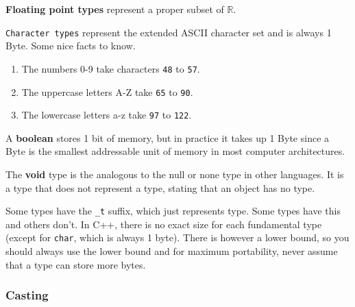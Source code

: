 \documentclass{article}
\newcounter{definition}[section]
\newcounter{example}[section]
\begin{document}
    \begin{definition}
      \label{def:floating-point-types}
      \textbf{Floating point types} represent a proper subset of $\mathbb{R}$. 
    \end{definition}

    \begin{definition}[Char]
      \label{def:char}
      \texttt{Character types} represent the extended ASCII character set and is always 1 Byte. Some nice facts to know. 
      \begin{enumerate}
        \item The numbers 0-9 take characters \texttt{48} to \texttt{57}.
        \item The uppercase letters A-Z take \texttt{65} to \texttt{90}. 
        \item The lowercase letters a-z take \texttt{97} to \texttt{122}. 
      \end{enumerate}
    \end{definition}

    \begin{definition}[Boolean]
      \label{def:boolean}
      A \textbf{boolean} stores 1 bit of memory, but in practice it takes up 1 Byte since a Byte is the smallest addressable unit of memory in most computer architectures. 
    \end{definition}

    \begin{definition}[Void]
      \label{def:void}
      The \textbf{void} type is the analogous to the null or none type in other languages. It is a type that does not represent a type, stating that an object has no type. 
    \end{definition} 

    \begin{example}
      \label{ex:types-with-t-suffix}
      Some types have the \texttt{\_t} suffix, which just represents type. Some types have this and others don't. In C++, there is no exact size for each fundamental type (except for \texttt{char}, which is always 1 byte). There is however a lower bound, so you should always use the lower bound and for maximum portability, never assume that a type can store more bytes. 
    \end{example}

    \subsubsection{Casting}
\end{document}
